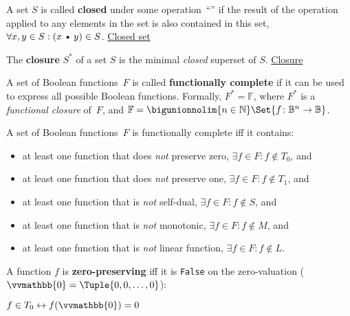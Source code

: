 \documentclass[a4paper,10pt]{article}
\begin{document}
\begin{terms}
    \item A set $S$ is called \textbf{closed} under some operation~\enquote{\textbullet} if the result of the operation applied to any elements in the set is also contained in this set, \ie $\forall x,y \in S: (x \mathbin{\text{\textbullet}} y) \in S$.
    \hfill\href{https://mathworld.wolfram.com/ClosedSet.html}{Closed set}

    \item The \textbf{closure} $S^{*}$ of a set $S$ is the minimal \emph{closed} superset of $S$.
    \hfill\href{https://mathworld.wolfram.com/SetClosure.html}{Closure}


    \item A set of Boolean functions~$F$ is called \textbf{functionally complete} if it can be used to express all possible Boolean functions.
    Formally, $F^{*} = \mathbb{F}$, where $F^{*}$ is a \emph{functional closure} of~$F$, and $\mathbb{F} = \bigunionnolim{n \in \Natural} \Set{ f \colon \Bool^{n} \to \Bool }$.

    \begin{posttheorem}
        A set of Boolean functions~$F$ is functionally complete iff it contains:
        \begin{itemize}[left=1pc]
            \item at least one function that does \textit{not} preserve zero, \ie $\exists f \in F: f \notin T_0$, and
            \item at least one function that does \textit{not} preserve one, \ie $\exists f \in F: f \notin T_1$, and
            \item at least one function that is \textit{not} self-dual, \ie $\exists f \in F: f \notin S$, and
            \item at least one function that is \textit{not} monotonic, \ie $\exists f \in F: f \notin M$, and
            \item at least one function that is \textit{not} linear function, \ie $\exists f \in F: f \notin L$.
        \end{itemize}
    \end{posttheorem}

    \item A function $f$ is \textbf{zero-preserving} iff it is \texttt{False} on the zero-valuation ($\vvmathbb{0} = \Tuple{0,0,\dotsc,0}$):
    \par\quad$f \in T_0 \iff f(\vvmathbb{0}) = 0$


\end{terms}
\end{document}
